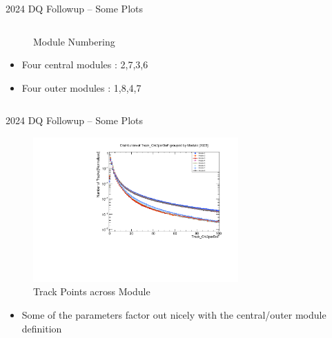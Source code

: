 \begin{frame}{2024 DQ Followup -- Some Plots}
\begin{columns}
\begin{column}{0.6 \textwidth}
\begin{figure}
            \caption{Module Numbering}
        \end{figure}
        \begin{itemize}
            \scriptsize
            \item Four central modules : 2,7,3,6
            \item Four outer modules : 1,8,4,7
        \end{itemize}
    \end{column}
\end{columns}
\end{frame}

\begin{frame}{2024 DQ Followup -- Some Plots}
    \begin{figure}
        \centering
        \includegraphics[width=0.7\textwidth]{assets/Track_Chi2perDoF_st0_2023.pdf}
        \caption{Track Points across Module}
    \end{figure}
    \begin{itemize}
        \item Some of the parameters factor out nicely with the central/outer module definition
    \end{itemize}
\end{frame}
